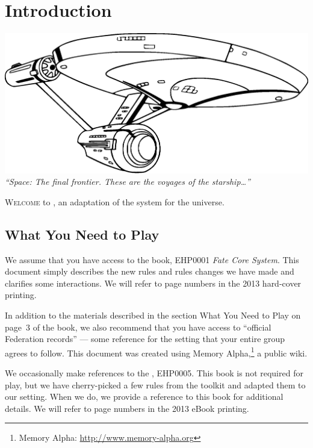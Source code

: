 \documentclass[12pt,titlepage,openany]{book}
\begin{document}
\chapter{Introduction}\label{chap:intro}

\begin{center}
    \includegraphics[width=0.6\linewidth]{img/Enterprise.eps}\\
    \vspace{2ex}
    \textit{``Space: The final frontier. These are the voyages of the
    starship\ldots''}
\end{center}

\vspace{1em}

\noindent
\lettrine[lines=1]{W}{elcome} to \StarTrekFate{}, an adaptation of the
\FateCore{} system for the \StarTrek{} universe.

\section{What You Need to Play}

We assume that you have access to the \FateCore{} book, EHP0001 \textit{Fate
Core System}. This document simply describes the new rules and rules changes we
have made and clarifies some interactions. We will refer to page numbers in the
2013 hard-cover printing.

In addition to the materials described in the section What You Need to Play on
page~3 of the \FateCore{} book, we also recommend that you have access to
``official Federation records'' --- some reference for the \StarTrek{} setting
that your entire group agrees to follow. This document was created using Memory
Alpha,\footnote{Memory Alpha: \url{http://www.memory-alpha.org}} a public
\StarTrek{} wiki.

We occasionally make references to the \FateSystemToolkit{}, EHP0005. This book
is not required for play, but we have cherry-picked a few rules from the
toolkit and adapted them to our setting. When we do, we provide a reference to
this book for additional details. We will refer to page numbers in the 2013
eBook printing.
\end{document}
